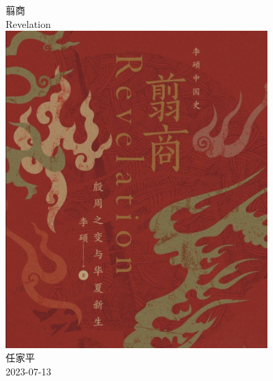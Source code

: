 \documentclass[a4paper, 12pt]{article}
\begin{document}
\begin{center}
    {\Huge 
        翦商}\\[12pt]
    {\huge 
        Revelation}\\[20pt]
    
    \includegraphics[height=12cm]{figure/cover.jpg} 
    \\[20pt] 

    {\Large 
        任家平\\[12pt]
        2023-07-13}
\end{center}
\thispagestyle{empty}



\newpage
{}
\tableofcontents
\newpage
{}



\end{document}
